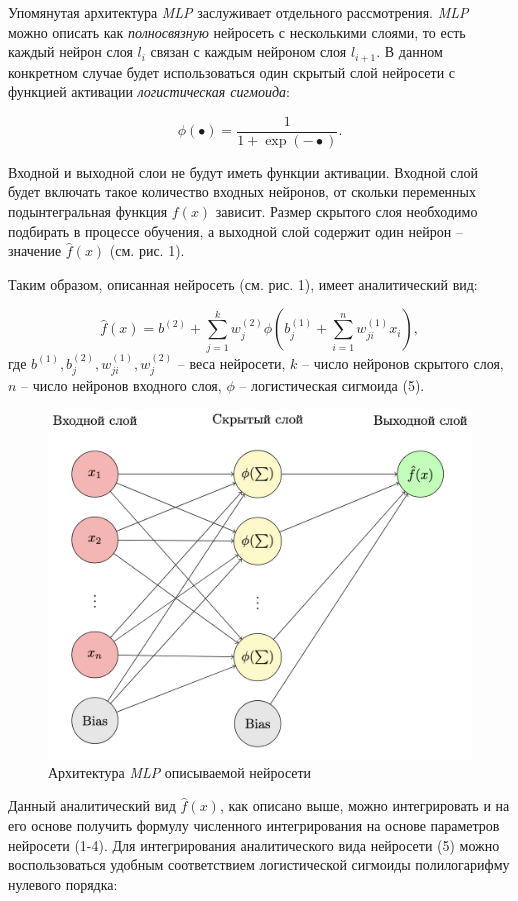 \documentclass[a4paper,12pt]{article} %
\renewcommand{\figurename}{Рисунок\_}
\begin{document}
Упомянутая архитектура \textit{MLP} заслуживает отдельного рассмотрения.  \textit{MLP} можно описать как \textit{полносвязную} нейросеть с несколькими слоями, то есть каждый нейрон слоя $l_i$ связан с каждым нейроном слоя $l_{i+1}$. В данном конкретном случае будет использоваться один скрытый слой нейросети с функцией активации \textit{логистическая сигмоида}: 

\begin{equation}
    \phi(•) = \frac{1}{1+\exp(-•)}.
\end{equation}
    
Входной и выходной слои не будут иметь функции активации. Входной слой будет включать такое количество входных нейронов, от скольки переменных подынтегральная функция $f(x)$ зависит. Размер скрытого слоя необходимо подбирать в процессе обучения, а выходной слой содержит один нейрон -- значение $\hat{f}(x)$ (см. рис. 1).

Таким образом, описанная нейросеть (см. рис. 1), имеет аналитический вид:

\begin{equation}
\hat{f}(x) = b^{(2)} + \sum_{j=1}^{k}w_j^{(2)}\phi(b_j^{(1)}+\sum_{i=1}^{n}w_{ji}^{(1)}x_{i}),
\end{equation}
где $b^{(1)}, b_j^{(2)}, w_{ji}^{(1)}, w_j^{(2)}$ -- веса нейросети, $k$ -- число нейронов скрытого слоя, $n$ -- число нейронов входного слоя, $\phi$ -- логистическая сигмоида (5).

\renewcommand{\figurename}{Рисунок}
\renewcommand{\thefigure}{1}
\begin{figure}
    \centering
    \includegraphics[width=0.5\linewidth]{architecture.png}
    \caption{Архитектура \textit{MLP} описываемой нейросети}
    \label{fig:enter-label}
\end{figure}

Данный аналитический вид $\hat{f}(x)$, как описано выше, можно интегрировать и на его основе получить формулу численного интегрирования на основе параметров нейросети (1-4). Для интегрирования аналитического вида нейросети (5) можно воспользоваться удобным соответствием логистической сигмоиды полилогарифму нулевого порядка:
\end{document}

